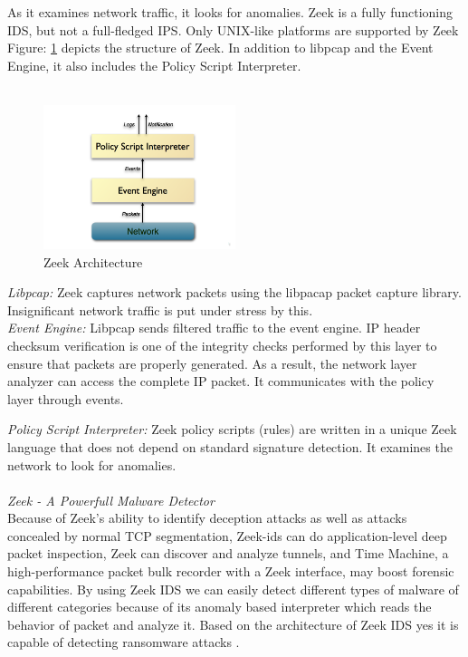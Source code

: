 As it examines network traffic, it looks for anomalies. Zeek is a fully functioning IDS, but not a full-fledged IPS. Only UNIX-like platforms are supported by Zeek Figure: \ref{fig:zeek_architecture} depicts the structure of Zeek. In addition to libpcap and the Event Engine, it also includes the Policy Script Interpreter.\\ 
\\
\begin{figure}[h]
    \centering
    \includegraphics[width=0.5\textwidth]{images/zeek_architecture.png}
    \caption{Zeek Architecture \cite{Zeek2019}}
    \label{fig:zeek_architecture}
\end{figure}


\textit{Libpcap:} Zeek captures network packets using the libpacap packet capture library. Insignificant network traffic \cite{SHIMEALL2014253} is put under stress by this. 
\\
\textit{Event Engine:} Libpcap sends filtered traffic to the event engine. IP header checksum verification is one of the integrity checks performed by this layer to ensure that packets are properly generated. As a result, the network layer analyzer can access the complete IP packet. It communicates with the policy layer through events. 

\textit{Policy Script Interpreter:} Zeek policy scripts (rules) are written in a unique Zeek language that does not depend on standard signature detection. It examines the network to look for anomalies.\\
\\
\textit{Zeek - A Powerfull Malware Detector}
\\
Because of Zeek's ability to identify deception attacks as well as attacks concealed by normal TCP segmentation, Zeek-ids can do application-level deep packet inspection, Zeek can discover and analyze tunnels, and Time Machine, a high-performance packet bulk recorder with a Zeek interface, may boost forensic capabilities.  By using Zeek IDS we can easily detect different types of malware of different categories because of its anomaly based interpreter which reads the behavior of packet and analyze it.  Based on the architecture of Zeek IDS yes it is capable of detecting ransomware attacks \cite{Bhosale2015}. 

